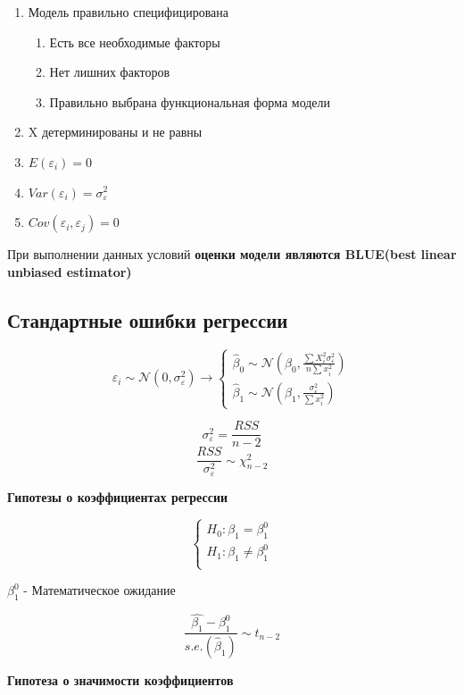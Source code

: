 \documentclass[a4paper, 12pt]{article}
\begin{document}
\begin{enumerate}
    \item Модель правильно специфицирована
    \begin{enumerate}
        \item Есть все необходимые факторы
        \item Нет лишних факторов
        \item Правильно выбрана функциональная форма модели
    \end{enumerate}
    \item X детерминированы и не равны
    \item $E(\varepsilon_i) = 0$
    \item $Var(\varepsilon_i) = \sigma_{\varepsilon}^2$
    \item $Cov(\varepsilon_i, \varepsilon_j) = 0$
\end{enumerate}

При выполнении данных условий \textbf{оценки модели являются BLUE(best linear unbiased estimator)}

\subsection{Стандартные ошибки регрессии}

\[\varepsilon_i \sim \mathcal{N}(0, \sigma_{\varepsilon}^2) \rightarrow 
\begin{cases}
    \hat{\beta}_0 \sim \mathcal{N}(\beta_0, \frac{\sum X_i^2\sigma_{\varepsilon}^2}{n\sum x_i^{2}}) \\ 
    \hat{\beta}_1 \sim \mathcal{N}(\beta_1, \frac{\sigma_{\varepsilon}^2}{\sum x_i^2})
\end{cases}\]

\[\sigma_{\varepsilon}^2 = \frac{RSS}{n - 2}\]
\[\frac{RSS}{\sigma_{\varepsilon}^2} \sim \chi_{n - 2}^2\]

\textbf{Гипотезы о коэффициентах регрессии}

\[
\begin{cases}
    H_0: \beta_1 = \beta_1^{0} \\
    H_1: \beta_1 \neq \beta_1^0 \\
\end{cases}
\]

$\beta_1^{0}$ - Математическое ожидание

\[\frac{\hat{\beta_1} - \beta_1^0}{s.e.(\hat{\beta}_1)} \sim t_{n-2}\]

\textbf{Гипотеза о значимости коэффициентов}
\end{document}
